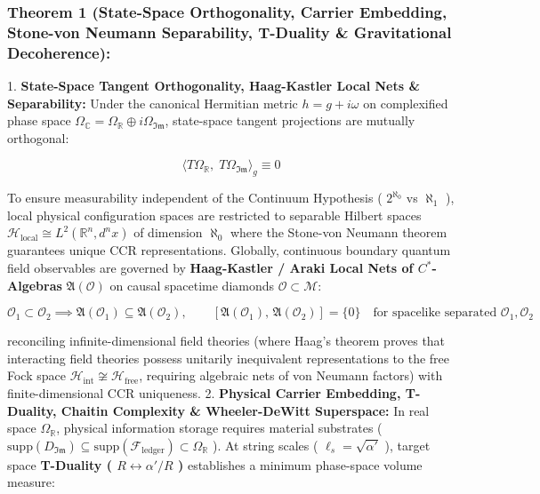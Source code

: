 \documentclass[11pt,a4paper]{article}
\theoremstyle{definition}\newtheorem{definition}{Definition}
\theoremstyle{remark}\newtheorem{remark}{Remark}
\begin{document}
\subsubsection{Theorem 1 (State-Space Orthogonality, Carrier Embedding, Stone-von Neumann Separability, T-Duality \& Gravitational Decoherence):}

1. \textbf{State-Space Tangent Orthogonality, Haag-Kastler Local Nets \& Separability:} Under the canonical Hermitian metric $h = g + i\omega$ on complexified phase space $\Omega_{\mathbb{C}} = \Omega_{\mathbb{R}} \oplus i \Omega_{\mathfrak{Im}}$, state-space tangent projections are mutually orthogonal:


\begin{equation}
\langle T\Omega_{\mathbb{R}}, \; T\Omega_{\mathfrak{Im}} \rangle_g \equiv 0
\end{equation}


To ensure measurability independent of the Continuum Hypothesis ( $2^{\aleph_0}$ vs $\aleph_1$ ), local physical configuration spaces are restricted to separable Hilbert spaces $\mathcal{H}_{\text{local}} \cong L^2(\mathbb{R}^n, d^n x)$ of dimension $\aleph_0$ where the Stone-von Neumann theorem guarantees unique CCR representations. Globally, continuous boundary quantum field observables are governed by \textbf{Haag-Kastler / Araki Local Nets of $C^*$-Algebras} $\mathfrak{A}(\mathcal{O})$ on causal spacetime diamonds $\mathcal{O} \subset \mathcal{M}$:


\begin{equation}
\boxed{\mathcal{O}_1 \subset \mathcal{O}_2 \implies \mathfrak{A}(\mathcal{O}_1) \subseteq \mathfrak{A}(\mathcal{O}_2), \qquad [\mathfrak{A}(\mathcal{O}_1), \, \mathfrak{A}(\mathcal{O}_2)] = \{0\} \quad \text{for spacelike separated } \mathcal{O}_1, \mathcal{O}_2}
\end{equation}


reconciling infinite-dimensional field theories (where Haag's theorem proves that interacting field theories possess unitarily inequivalent representations to the free Fock space $\mathcal{H}_{\text{int}} \not\cong \mathcal{H}_{\text{free}}$, requiring algebraic nets of von Neumann factors) with finite-dimensional CCR uniqueness.
2. \textbf{Physical Carrier Embedding, T-Duality, Chaitin Complexity \& Wheeler-DeWitt Superspace:} In real space $\Omega_{\mathbb{R}}$, physical information storage requires material substrates ( $\mathrm{supp}(D_{\mathfrak{Im}}) \subseteq \mathrm{supp}(\mathcal{F}_{\text{ledger}}) \subset \Omega_{\mathbb{R}}$ ). At string scales ( $\ell_s = \sqrt{\alpha'}$ ), target space \textbf{T-Duality ( $R \leftrightarrow \alpha'/R$ )} establishes a minimum phase-space volume measure:
\end{document}
